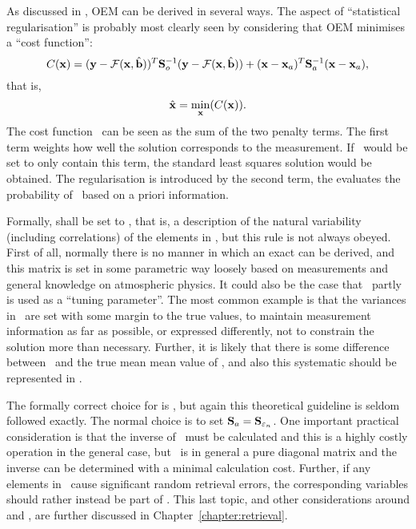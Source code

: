 As discussed in \citet{rodgers:00}, OEM can be derived in several ways. The
aspect of ``statistical regularisation'' is probably most clearly seen by
considering that OEM minimises a ``cost function'':
\begin{equation}
  \label{eq:costfun}
  C(\mathbf{x}) = (\mathbf{y}-\mathcal{F}(\mathbf{x},\hat{\mathbf{b}}))^T\mathbf{S}_{o}^{-1}
  (\mathbf{y}-\mathcal{F}(\mathbf{x},\hat{\mathbf{b}})) +
  (\mathbf{x}-\mathbf{x}_{a})^T\mathbf{S}_{a}^{-1}(\mathbf{x}-\mathbf{x}_{a}),
\end{equation}
that is,
\begin{equation}
  \hat{\mathbf{x}} = \min\limits_{\mathbf{x}}(C(\mathbf{x})).
\end{equation}
The cost function \CstFnc\ can be seen as the sum of the two penalty terms. The
first term weights how well the solution corresponds to the measurement. If
\CstFnc\ would be set to only contain this term, the standard least squares
solution would be obtained. The regularisation is introduced by the second
term, the evaluates the probability of \SttVct\ based on a priori
information.

Formally,  shall be set to \aCvrMtr{\SttVct}, that is, a description
of the natural variability (including correlations) of the elements in \SttVct,
but this rule is not always obeyed. First of all, normally there is no manner
in which an exact \aCvrMtr{\SttVct} can be derived, and this matrix is set in
some parametric way loosely based on measurements and general knowledge on
atmospheric physics. It could also be the case that \ partly is used
as a ``tuning parameter''. The most common example is that the variances in
\ are set with some margin to the true values, to maintain
measurement information as far as possible, or expressed differently, not to
constrain the solution more than necessary. Further, it is likely that there is
some difference between \ and the true mean mean value of \SttVct,
and also this systematic should be represented in 
\citep{eriksson:analy:00}.

The formally correct choice for  is 
\citep{eriksson:analy:00,rodgers:00}, but again this theoretical guideline is
seldom followed exactly. The normal choice is to set
$\mathbf{S}_{a}=\mathbf{S}_{\varepsilon_n}$. One important practical consideration is
that the inverse of \ must be calculated and this is a
highly costly operation in the general case, but \ is in
general a pure diagonal matrix and the inverse can be determined with a minimal
calculation cost. Further, if any elements in \FrwMdlVct\ cause significant
random retrieval errors, the corresponding variables should rather instead be
part of \SttVct. This last topic, and other considerations around 
and , are further discussed in Chapter~\ref{chapter:retrieval}.

